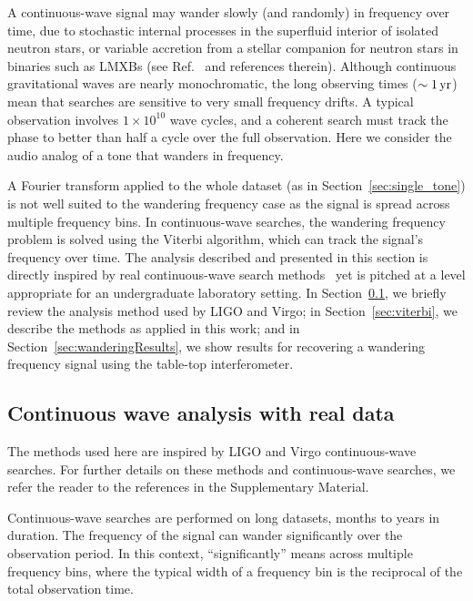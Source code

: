 \documentclass[paper-main.tex]{subfiles}
\begin{document}
A continuous-wave signal may wander slowly (and randomly) in frequency over time, due to stochastic internal processes in the superfluid interior of isolated neutron stars, or variable accretion from a stellar companion for neutron stars in binaries such as LMXBs (see Ref.~\cite{SuvorovaEtAl:2017} and references therein).
Although continuous gravitational waves are nearly monochromatic, the long observing times ($\sim 1\,{\rm yr}$) mean that searches are sensitive to very small frequency drifts. 
A typical observation involves $1 \times 10^{10}$ wave cycles, and a coherent search must track the phase to better than half a cycle over the full observation. 
Here we consider the audio analog of a tone that wanders in frequency. 



A Fourier transform applied to the whole dataset (as in Section~\ref{sec:single_tone}) is not well suited to the wandering frequency case as the signal is spread across multiple frequency bins. 
In continuous-wave searches, the wandering frequency problem is solved using the Viterbi algorithm,\cite{Viterbi:1967} which can track the signal's frequency over time.
The analysis described and presented in this section is directly inspired by real continuous-wave search methods~\cite{SuvorovaEtAl:2017} yet is pitched at a level appropriate for an undergraduate laboratory setting. 
In Section~\ref{sec:realCWSearches}, we briefly review the analysis method used by LIGO and Virgo; in Section~\ref{sec:viterbi}, we describe the methods as applied in this work; and in Section~\ref{sec:wanderingResults}, we show results for recovering a wandering frequency signal using the table-top interferometer. 


\subsection{Continuous wave analysis with real data}
\label{sec:realCWSearches}


The methods used here are inspired by LIGO and Virgo continuous-wave searches. 
For further details on these methods and continuous-wave searches, we refer the reader to the references in the Supplementary Material. 


Continuous-wave searches are performed on long datasets, months to years in duration. 
The frequency of the signal can wander significantly over the observation period. 
In this context, ``significantly'' means across multiple frequency bins, where the typical width of a frequency bin is the reciprocal of the total observation time.\cite{JKS:1998,ScoX1O2Viterbi:2019}
\end{document}
